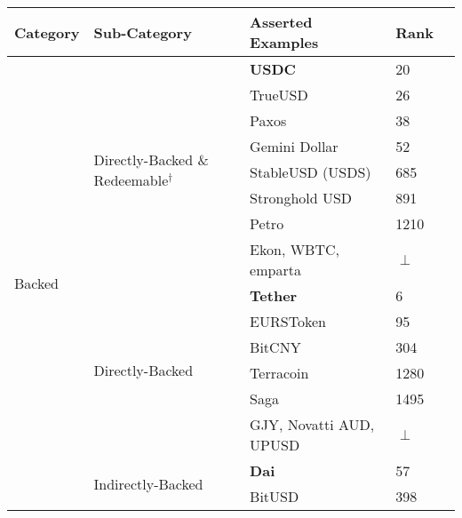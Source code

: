 \begin{table}[t]
\centering

\begin{tabular}{|l|l|l|l|l|}

\hline
\rowcolor{lightgray}
\textbf{Category} & \textbf{Sub-Category} & \textbf{Asserted Examples} & Rank \\  \hline

\multirow{16}{*}{Backed}		& \multirow{8}{*}{Directly-Backed \& Redeemable$^{\dagger}$}		& \textbf{USDC} & 20 \\ \cline{3-4}
						&														& TrueUSD & 26 \\ \cline{3-4}	
						&														& Paxos & 38 \\ \cline{3-4}												
						&														& Gemini Dollar & 52 \\ \cline{3-4}
						&														& StableUSD (USDS) & 685 \\ \cline{3-4}
						&														& Stronghold USD & 891 \\ \cline{3-4}
						&														& Petro & 1210 \\ \cline{3-4}
						&														& \multicolumn{1}{p{5cm}|}{Ekon, WBTC, emparta} & $\perp$ \\ \cline{2-4}
						& \multirow{6}{*}{Directly-Backed}  								& \textbf{Tether} & 6 \\ \cline{3-4}
						&														& EURSToken & 95 \\ \cline{3-4}
						&														& BitCNY & 304 \\ \cline{3-4}
						&														& Terracoin & 1280 \\ \cline{3-4}
						&														& Saga & 1495 \\  \cline{3-4}
						&														& \multicolumn{1}{p{5cm}|}{GJY, Novatti AUD, UPUSD} & $\perp$ \\ \cline{2-4} 						
						& \multirow{2}{*}{Indirectly-Backed}								& \textbf{Dai} & 57 \\ \cline{3-4}
                                                &														& BitUSD & 398 \\  \cline{1-4}
 
                                                                                                                 
                                                                                                                 

\end{tabular}
\end{table}
